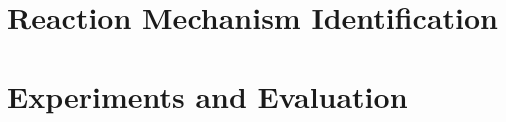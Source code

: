 \documentclass{article}
\begin{document}









\section{Reaction Mechanism Identification}




\section{Experiments and Evaluation}


%



\vspace{-0.5em}

\end{document}
